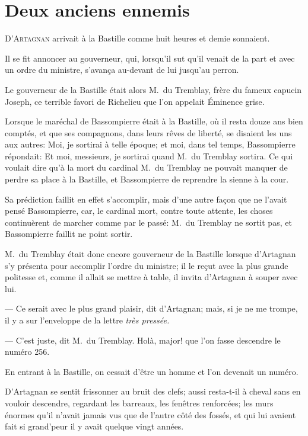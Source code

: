 \chapter{Deux anciens ennemis}

\lettrine{D}{'Artagnan} arrivait à la Bastille comme huit heures et demie sonnaient.

\zz
Il se fit annoncer au gouverneur, qui, lorsqu'il sut qu'il venait de la part et avec un ordre du ministre, s'avança au-devant de lui jusqu'au perron.

\zz
Le gouverneur de la Bastille était alors M.~du Tremblay, frère du fameux capucin Joseph, ce terrible favori de Richelieu que l'on appelait Éminence grise.

Lorsque le maréchal de Bassompierre était à la Bastille, où il resta douze ans bien comptés, et que ses compagnons, dans leurs rêves de liberté, se disaient les uns aux autres: Moi, je sortirai à telle époque; et moi, dans tel temps, Bassompierre répondait: Et moi, messieurs, je sortirai quand M.~du Tremblay sortira. Ce qui voulait dire qu'à la mort du cardinal M.~du Tremblay ne pouvait manquer de perdre sa place à la Bastille, et Bassompierre de reprendre la sienne à la cour.

Sa prédiction faillit en effet s'accomplir, mais d'une autre façon que ne l'avait pensé Bassompierre, car, le cardinal mort, contre toute attente, les choses continuèrent de marcher comme par le passé: M.~du Tremblay ne sortit pas, et Bassompierre faillit ne point sortir.

M.~du Tremblay était donc encore gouverneur de la Bastille lorsque d'Artagnan s'y présenta pour accomplir l'ordre du ministre; il le reçut avec la plus grande politesse et, comme il allait se mettre à table, il invita d'Artagnan à souper avec lui.

— Ce serait avec le plus grand plaisir, dit d'Artagnan; mais, si je ne me trompe, il y a sur l'enveloppe de la lettre \textit{très pressée.}

— C'est juste, dit M.~du Tremblay. Holà, major! que l'on fasse descendre le numéro 256.

En entrant à la Bastille, on cessait d'être un homme et l'on devenait un numéro.

D'Artagnan se sentit frissonner au bruit des clefs; aussi resta-t-il à cheval sans en vouloir descendre, regardant les barreaux, les fenêtres renforcées; les murs énormes qu'il n'avait jamais vus que de l'autre côté des fossés, et qui lui avaient fait si grand'peur il y avait quelque vingt années.

